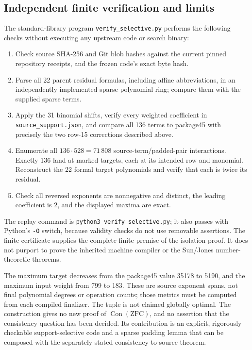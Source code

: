 \subsection{Independent finite verification and limits}
The standard-library program \texttt{verify\_selective.py} performs the
following checks without executing any upstream code or search binary:
\begin{enumerate}
\item Check source SHA-256 and Git blob hashes against the current pinned
repository receipts, and the frozen code's exact byte hash.
\item Parse all 22 parent residual formulas, including affine
abbreviations, in an independently implemented sparse polynomial ring;
compare them with the supplied sparse terms.
\item Apply the 31 binomial shifts, verify every weighted coefficient in
\texttt{source\_support.json}, and compare all 136 terms to package45
with precisely the two row-15 corrections described above.
\item Enumerate all $136\cdot528=71\,808$ source-term/padded-pair
interactions.  Exactly 136 land at marked targets, each at its intended
row and monomial.  Reconstruct the 22 formal target polynomials and
verify that each is twice its residual.
\item Check all reversed exponents are nonnegative and distinct, the
leading coefficient is 2, and the displayed maxima are exact.
\end{enumerate}
The replay command is \texttt{python3 verify\_selective.py}; it also
passes with Python's \texttt{-O} switch, because validity checks do not
use removable assertions.  The finite certificate supplies the complete
finite premise of the isolation proof.  It does not purport to prove the
inherited machine compiler or the Sun/Jones number-theoretic theorems.

The maximum target decreases from the package45 value 35178 to 5190,
and the maximum input weight from 799 to 183.  These are source exponent
spans, not final polynomial degrees or operation counts; those metrics
must be computed from each compiled finalizer.  The tuple is not claimed
globally optimal.  The construction gives no new proof of
$\operatorname{Con}(\mathrm{ZFC})$, and no assertion that the consistency
question has been decided.  Its contribution is an explicit, rigorously
checkable support-selective code and a sparse padding lemma that can be
composed with the separately stated consistency-to-source theorem.
